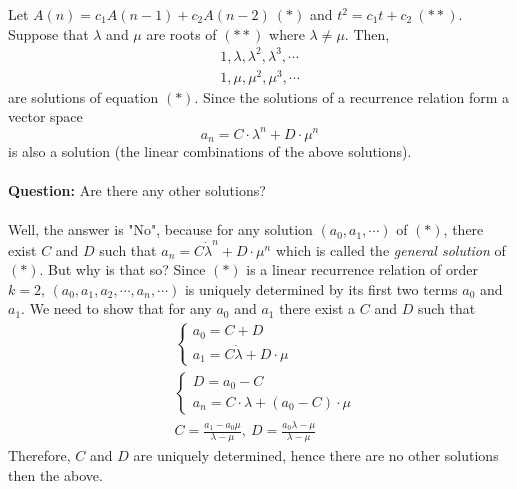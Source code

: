 Let $A(n)=c_1 A(n-1) + c_2 A(n-2)\ (*)$ and $t^2=c_1t +c_2\ (**)$. Suppose that $\lambda$ and $\mu$ are roots of $(**)$ where $\lambda \neq \mu$.
Then, 
\begin{align*}
1, \lambda, \lambda^2, \lambda^3, \cdots \\
1, \mu, \mu^2, \mu^3, \cdots
\end{align*}
are solutions of equation $(*)$. Since the solutions of a recurrence relation form a vector space 
$$
a_n=C \cdot \lambda^n + D \cdot \mu^n 
$$
is also a solution (the linear combinations of the above solutions).\\\\
\textbf{Question:} Are there any other solutions? 
\\
\\
Well, the answer is "No", because for any solution $(a_0, a_1, \cdots)$ of $(*)$, there exist $C$
 and $D$ such that $a_n=C \dot \lambda^n + D \cdot \mu^n$ which is called the \textit{general solution} of $(*)$. But why is that so?
Since $(*)$ is a linear recurrence relation of order $k=2$, $(a_0, a_1, a_2, \cdots, a_n, \cdots)$ is uniquely determined by its first two terms $a_0$ and $a_1$.
We need to show that for any $a_0$ and $a_1$ there exist a $C$ and $D$ such that
\begin{align*}
&\begin{cases}
    a_0 = C + D\\    
    a_1 = C \dot \lambda + D \cdot \mu   
\end{cases}\\
&\begin{cases}
    D = a_0 - C\\    
    a_n = C \cdot \lambda + (a_0 - C) \cdot \mu   
\end{cases}\\
&
C=\frac{a_1 - a_0 \mu}{\lambda - \mu},\ D=\frac{a_0 \lambda - \mu}{\lambda - \mu} 
\end{align*}
\noindent
Therefore, $C$ and $D$ are uniquely determined, hence there are no other solutions then the above.

